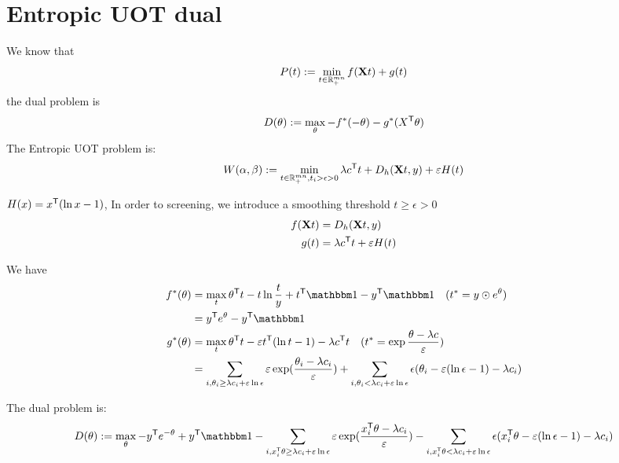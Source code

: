
\section{Entropic UOT dual}
We know that 
\begin{equation}
P(t):= \min_{t \in \mathbb{R}_{+}^{mn}} f(\mathbf{X} t) + g(t)
\end{equation}
the dual problem is 
\begin{equation}
D(\theta) := \max_{\theta} -f^*(-\theta) - g^*(X^{\mathsf T}\theta)
\end{equation}
The Entropic UOT problem is:
\begin{equation}
\label{eq:euot}
W(\alpha,\beta) := \min_{t \in \mathbb{R}_{+}^{mn}, t_i>\epsilon>0} \lambda c^{\mathsf T}t + D_h(\mathbf{X}t,y) + \varepsilon H(t)
\end{equation} 

$H(x) = x^{\mathsf T}(\ln x - 1)$, In order to screening, we introduce a smoothing threshold $t\geq \epsilon >0$ 
$$
\begin{aligned}
f(\mathbf{X} t) &=  D_h(\mathbf{X}t,y) \\
g(t) &= \lambda c^{\mathsf T} t + \varepsilon H(t)
\end{aligned}
$$

We have 
$$
\begin{aligned}
f^{*}(\theta) &= \max_t \theta^{\tranT} t -  t\ln \frac{t}{y} + t^{\tranT}\one - y^{\tranT}\one\quad (t^{*}=y \odot e^{\theta})\\
&=y^{\tranT} e^{\theta} - y^{\tranT}\one \\
g^{*}(\theta) &= \max_t \theta^{\tranT} t - \varepsilon t^{\tranT}(\ln t -1) - \lambda c^{\tranT}t \quad(t^* = \exp{\frac{\theta-\lambda c}{\varepsilon}})\\
&= \sum_{i,\theta_i\geq\lambda c_i +\varepsilon\ln \epsilon } \varepsilon \exp(\frac{\theta_i-\lambda c_i}{\varepsilon})+\sum_{i,\theta_i<\lambda c_i +\varepsilon\ln \epsilon} \epsilon(\theta_i - \varepsilon(\ln\epsilon-1)-\lambda c_i) 
\end{aligned}
$$

The dual problem is:
\begin{equation}
\label{eq:reuot}
D(\theta) := \max_{\theta} -y^{\tranT}e^{-\theta} + y^{\tranT}\one - \sum_{i,x_i^{\tranT}\theta\geq\lambda c_i +\varepsilon\ln \epsilon} \varepsilon \exp(\frac{x_i^{\tranT}\theta-\lambda c_i}{\varepsilon}) - \sum_{i,x_i^{\tranT}\theta<\lambda c_i +\varepsilon\ln \epsilon } \epsilon(x_i^{\tranT}\theta - \varepsilon(\ln\epsilon-1)-\lambda c_i)
\end{equation}

